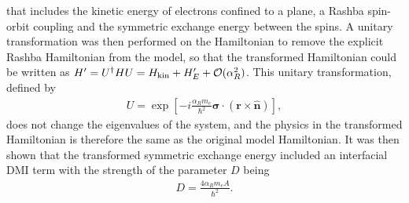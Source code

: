 that includes the kinetic energy of electrons confined to a plane, a Rashba spin-orbit coupling and the symmetric exchange energy between the spins. A unitary transformation was then performed on the Hamiltonian to remove the explicit Rashba Hamiltonian from the model, so that the transformed Hamiltonian could be written as $H' = U^{\dagger} H U = H_{\textrm{kin}} + H_E' + \mathcal{O}(\alpha_R^2)$. This unitary transformation, defined by
\begin{align}
U = \exp\left[-i\frac{\alpha_R m_e}{\hbar^2}\mathbold{\sigma}\cdot(\mathbold{r}\times\mathbold{\hat{n}})\right],
\end{align}
does not change the eigenvalues of the system, and the physics in the transformed Hamiltonian is therefore the same as the original model Hamiltonian. It was then shown that the transformed symmetric exchange energy included an interfacial DMI term with the strength of the parameter $D$ being
\begin{align}
\label{eq:DalphaR}
D = \frac{4\alpha_Rm_e A}{\hbar^2}.
\end{align}

